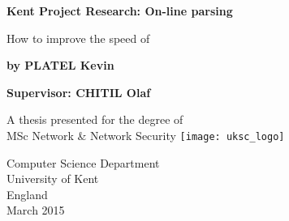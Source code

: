 \begin{titlepage}
    \begin{center}
        \vspace*{1cm}
        
        \textbf{Kent Project Research: On-line parsing}
        
        \vspace{0.5cm}
        How to improve the speed of 
        \vspace{1.5cm}
        
        \textbf{by PLATEL Kevin}
        
        \textbf{Supervisor: CHITIL Olaf}
        
        \vspace{1cm}
        
        A thesis presented for the degree of\\
        MSc Network \& Network Security
        \texttt{[image: uksc\_logo]}
        \vfill
        
        Computer Science Department\\
        University of Kent\\
        England\\
        March 2015
        
    \end{center}
\end{titlepage}